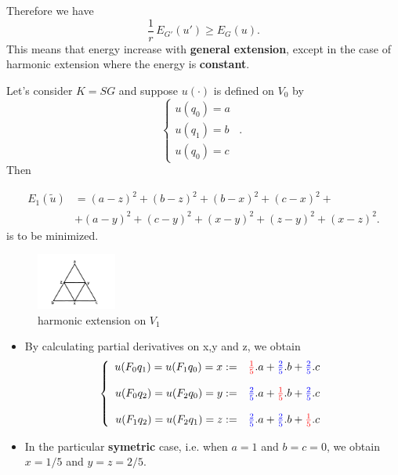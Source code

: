 \begin{frame}
Therefore we have
\begin{equation}
    \frac{1}{r}\,E_{G'}(u')\geq E_G(u).
\end{equation}
This means that energy increase with \textbf{general extension}, except in the case of harmonic extension where the energy is \textbf{constant}.
\begin{example}
    Let's consider $K=SG$ and suppose $u(\cdot)$ is defined on $V_0$ by 
$$
\left\{
\begin{array}{rcl}
   u(q_0)=a  \\
   u(q_1)=b&.\\
   u(q_0)=c&
\end{array}\right.
$$
Then 

\begin{align*}
    E_1(\tilde{u})&=(a-z)^2+(b-z)^2+(b-x)^2+(c-x)^2+\\
    &+(a-y)^2+(c-y)^2+ (x-y)^2+(z-y)^2+(x-z)^2.
\end{align*}
is to be minimized.
\end{example}
\end{frame}
\begin{frame}
\begin{figure}
\centering
\includegraphics[height=5em]{images/harmonic extension order 1.pdf}
\caption{harmonic extension on $V_1$}
\end{figure}

\begin{itemize}
\item By calculating partial derivatives on x,y and z, we obtain 
\begin{align}\label{1st harm extension}
    \left\{ \begin{array}{rcl}
        u(F_0q_1)=u(F_1q_0)=x:=& {\color{red} \frac{1}{5}}.a+{\color{blue} \frac{2}{5}}.b+{\color{blue} \frac{2}{5}}.c \\
        \\
        u(F_0q_2)=u(F_2q_0)=y:=& {\color{blue} \frac{2}{5}}.a+{\color{red} \frac{1}{5}}.b+{\color{blue} \frac{2}{5}}.c \\
        \\
        u(F_1q_2)=u(F_2q_1)=z:=& {\color{blue} \frac{2}{5}}.a+{\color{blue} \frac{2}{5}}.b+{\color{red} \frac{1}{5}}.c \\
    \end{array}\right.
\end{align}

\item In the particular \textbf{symetric} case, i.e. when $a=1$ and $b=c=0$, we obtain $x=1/5$ and $y=z=2/5$. 
\end{itemize}
\end{frame}
